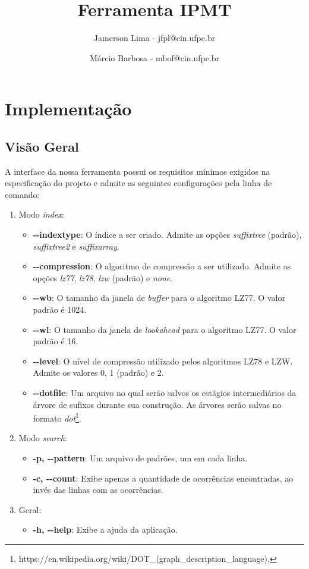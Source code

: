 \documentclass[]{article}
\title{Ferramenta IPMT}
\author{Jamerson Lima - jfpl@cin.ufpe.br \and Márcio Barbosa - mbof@cin.ufpe.br}
\date{}
\begin{document}
\maketitle

\section{Implementação}

\subsection{Visão Geral}

A interface da nossa ferramenta possui os requisitos mínimos exigidos na especificação do projeto e admite as seguintes configurações pela linha de comando:
\begin{enumerate}
	\item Modo \textit{index}:
		\begin{itemize}
			\item \textbf{-{}-indextype}: O índice a ser criado. Admite as opções \textit{suffixtree} (padrão), \textit{suffixtree2} e \textit{suffixarray}. 
			\item \textbf{-{}-compression}: O algoritmo de compressão a ser utilizado. Admite as opções \textit{lz77}, \textit{lz78}, \textit{lzw} (padrão) e \textit{none}.
			\item \textbf{-{}-wb}: O tamanho da janela de \textit{buffer} para o algoritmo LZ77. O valor padrão é 1024.
			\item \textbf{-{}-wl}: O tamanho da janela de \textit{lookahead} para o algoritmo LZ77. O valor padrão é 16.
			\item \textbf{-{}-level}: O nível de compressão utilizado pelos algoritmos LZ78 e LZW. Admite os valores 0, 1 (padrão) e 2.
			\item \textbf{-{}-dotfile}: Um arquivo no qual serão salvos os estágios intermediários da árvore de sufixos durante sua construção. As árvores serão salvas no formato \textit{dot}\footnote{https://en.wikipedia.org/wiki/DOT\_(graph\_description\_language).}.
		\end{itemize}

	\item Modo \textit{search}:
		\begin{itemize}
			\item \textbf{-p, -{}-pattern}: Um arquivo de padrões, um em cada linha.
			\item \textbf{-c, -{}-count}: Exibe apenas a quantidade de ocorrências encontradas, ao invés das linhas com as ocorrências.
		\end{itemize}
	
	\item Geral:
		\begin{itemize}
			\item \textbf{-h, -{}-help}: Exibe a ajuda da aplicação.
		\end{itemize}
			
\end{enumerate}
\end{document}
